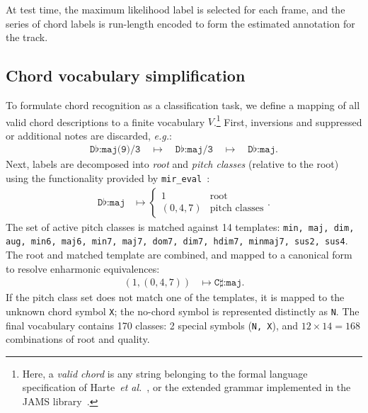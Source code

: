 \documentclass{article}
\def\eg{\emph{e.g.}}
\begin{document}
At test time, the maximum likelihood label is selected for each frame, and the series of chord labels is run-length encoded to form the estimated annotation for the track.


\subsection{Chord vocabulary simplification}

\label{sec:vocab}
%

To formulate chord recognition as a classification task, we define a mapping of all valid chord descriptions to a finite vocabulary $V$.\footnote{Here, a \emph{valid chord} is any string belonging to the formal language specification of Harte~\emph{et al.}~\cite{harte2005symbolic}, or the extended grammar implemented in the JAMS library~\cite{humphrey2014jams}.}
First, inversions and suppressed or additional notes are discarded, \eg:
\begin{align*}
    \texttt{D}\flat\texttt{:maj(9)/3} 
    \quad\mapsto\quad \texttt{D}\flat\texttt{:maj/3}
    \quad\mapsto\quad \texttt{D}\flat\texttt{:maj}.
\end{align*}
Next, labels are decomposed into \emph{root} and \emph{pitch classes} (relative to the root) using the functionality provided by \texttt{mir\_eval}~\cite{raffel2014mir_eval}:
\begin{align*}
    \texttt{D}\flat\texttt{:maj} &\mapsto \begin{cases}
        1 & \text{root}\\
        (0, 4, 7) & \text{pitch classes}
    \end{cases}.
\end{align*}
The set of active pitch classes is matched against 14 templates: \texttt{min, maj, dim, aug, min6, maj6, min7, maj7, dom7, dim7, hdim7, minmaj7, sus2, sus4}.
The root and matched template are combined, and mapped to a canonical form to resolve enharmonic equivalences:
\begin{align*}
    \left(1, (0, 4, 7) \right) &\mapsto \texttt{C}\sharp\texttt{:maj}.
\end{align*}
If the pitch class set does not match one of the templates, it is mapped to the unknown chord symbol \texttt{X}; the no-chord symbol is represented distinctly as \texttt{N}.
The final vocabulary contains 170 classes: 2 special symbols (\texttt{N, X}), and $12\times14=168$ combinations of root and quality.
\end{document}
